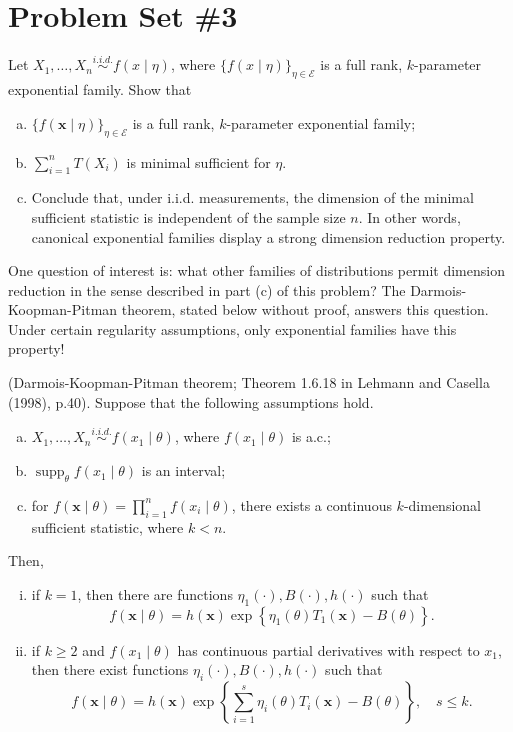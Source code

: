 \section{Problem Set \#3}

\begin{exercise}
    Let \(X_{1}, \ldots, X_{n} \stackrel{i.i.d.}{\sim} f(x \mid \eta)\), where \(\{f(x \mid \eta)\}_{\eta \in \mathcal{E}}\) is a full rank, \(k\)-parameter exponential family. Show that
    \begin{enumerate}[(a)]
        \item \(\{f(\mathbf{x} \mid \eta)\}_{\eta \in \mathcal{E}}\) is a full rank, \(k\)-parameter exponential family; 
        \item \(\sum_{i=1}^{n} T\left(X_{i}\right)\) is minimal sufficient for \(\eta\). 
        \item Conclude that, under i.i.d. measurements, the dimension of the minimal sufficient statistic is independent of the sample size \(n\). In other words, canonical exponential families display a strong dimension reduction property. 
    \end{enumerate}
     One question of interest is: what other families of distributions permit dimension reduction in the sense described in part (c) of this problem? The Darmois-Koopman-Pitman theorem, stated below without proof, answers this question. Under certain regularity assumptions, only exponential families have this property!
    
     (Darmois-Koopman-Pitman theorem; Theorem 1.6.18 in Lehmann and Casella (1998), p.40). Suppose that the following assumptions hold.
    \begin{enumerate}[(a)]
        \item \(X_{1}, \ldots, X_{n} \stackrel{i.i.d. }{\sim} f\left(x_{1} \mid \theta\right)\), where \(f\left(x_{1} \mid \theta\right)\) is a.c.; 
        \item \(\operatorname{supp}_{\theta} f\left(x_{1} \mid \theta\right)\) is an interval; 
        \item for \(f(\boldsymbol{x} \mid \theta)=\prod_{i=1}^{n} f\left(x_{i} \mid \theta\right)\), there exists a continuous \(k\)-dimensional sufficient statistic, where \(k<n\). 
    \end{enumerate}
    Then,
    \begin{enumerate}[(i)]
        \item if \(k=1\), then there are functions \(\eta_{1}(\cdot), B(\cdot), h(\cdot)\) such that
        \[
        f(\boldsymbol{x} \mid \theta)=h(\boldsymbol{x}) \exp \left\{\eta_{1}(\theta) T_{1}(\boldsymbol{x})-B(\theta)\right\}. 
        \]
        \item if \(k \geq 2\) and \(f\left(x_{1} \mid \theta\right)\) has continuous partial derivatives with respect to \(x_{1}\), then there exist functions \(\eta_{i}(\cdot), B(\cdot), h(\cdot)\) such that
        \[
        f(\boldsymbol{x} \mid \theta)=h(\boldsymbol{x}) \exp \left\{\sum_{i=1}^{s} \eta_{i}(\theta) T_{i}(\boldsymbol{x})-B(\theta)\right\}, \quad s \leq k .
        \]
    \end{enumerate}
\end{exercise}

